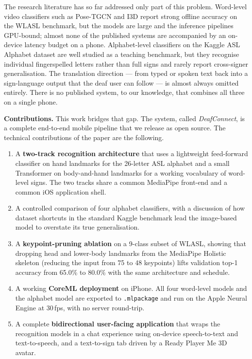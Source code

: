 \documentclass[11pt]{article}
\begin{document}
The research literature has so far addressed only part of this problem. Word-level video classifiers such as Pose-TGCN and I3D \citep{li2020wlasl, carreira2017quo} report strong offline accuracy on the WLASL benchmark, but the models are large and the inference pipelines GPU-bound; almost none of the published systems are accompanied by an on-device latency budget on a phone. Alphabet-level classifiers on the Kaggle ASL Alphabet dataset are well studied as a teaching benchmark, but they recognise individual fingerspelled letters rather than full signs and rarely report cross-signer generalisation. The translation direction --- from typed or spoken text back into a sign-language output that the deaf user can follow --- is almost always omitted entirely. There is no published system, to our knowledge, that combines all three on a single phone.

\textbf{Contributions.} This work bridges that gap. The system, called \emph{DeafConnect}, is a complete end-to-end mobile pipeline that we release as open source. The technical contributions of the paper are the following.

\begin{enumerate}
\itemsep -0.1em
\item A \textbf{two-track recognition architecture} that uses a lightweight feed-forward classifier on hand landmarks for the 26-letter ASL alphabet and a small Transformer on body-and-hand landmarks for a working vocabulary of word-level signs. The two tracks share a common MediaPipe front-end and a common iOS application shell.
\item A controlled comparison of four alphabet classifiers, with a discussion of how dataset shortcuts in the standard Kaggle benchmark lead the image-based model to overstate its true generalisation.
\item A \textbf{keypoint-pruning ablation} on a 9-class subset of WLASL, showing that dropping head and lower-body landmarks from the MediaPipe Holistic skeleton (reducing the input from 75 to 48 keypoints) lifts validation top-1 accuracy from 65.0\% to 80.0\% with the same architecture and schedule.
\item A working \textbf{CoreML deployment} on iPhone. All four word-level models and the alphabet model are exported to \texttt{.mlpackage} and run on the Apple Neural Engine at 30\,fps, with no server round-trip.
\item A complete \textbf{bidirectional user-facing application} that wraps the recognition models in a chat experience using on-device speech-to-text and text-to-speech, and a text-to-sign tab driven by a Ready Player Me 3D avatar.
\end{enumerate}
\end{document}
